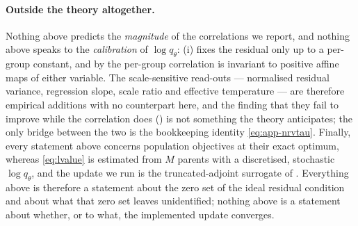 \paragraph{Outside the theory altogether.} Nothing above predicts the
\emph{magnitude} of the correlations we report, and nothing above speaks to the
\emph{calibration} of $\log q_\theta$: (i) fixes the residual
only up to a per-group constant, and by  the per-group correlation
is invariant to positive affine maps of either variable. The scale-sensitive
read-outs --- normalised residual variance, regression slope, scale ratio and
effective temperature --- are therefore empirical additions with no counterpart
here, and the finding that they fail to improve while the correlation does
() is not something the theory anticipates; the only bridge between
the two is the bookkeeping identity \eqref{eq:app-nrvtau}. Finally, every statement
above concerns population objectives at their exact optimum, whereas
\eqref{eq:lvalue} is estimated from $M$ parents with a discretised, stochastic
$\log q_\theta$, and the update we run is the truncated-adjoint surrogate of
. Everything above is therefore a statement about the zero
set of the ideal residual condition and about what that zero set leaves
unidentified; nothing above is a statement about whether, or to what, the
implemented update converges.
